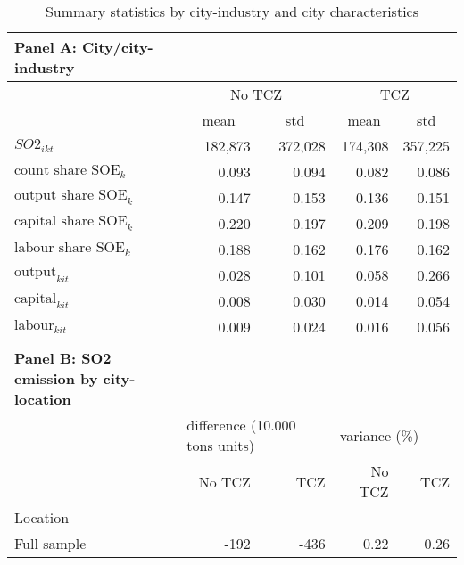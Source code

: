 \documentclass[12pt]{article}
\begin{document}
\begin{table}[!htbp] \centering
    \caption{ Summary statistics by city-industry and city characteristics}
      \begin{adjustbox}{width=\textwidth, totalheight=\baselineskip,keepaspectratio}
    \label{tab:table2}
    \begin{tabular}{lrrrr}
      \multicolumn{1}{l}{\textbf{\small Panel A: City/city-industry}} \\
      \toprule
      & \multicolumn{2}{c}{No TCZ} & \multicolumn{2}{c}{TCZ} \\
      & \multicolumn{1}{c}{mean} & \multicolumn{1}{c}{std} & \multicolumn{1}{c}{mean} & \multicolumn{1}{c}{std}\\
      \midrule
      $SO2_{ikt}$                  & 182,873 & 372,028 & 174,308 & 357,225 \\
      $\text{count share SOE}_k$   & 0.093  & 0.094  & 0.082  & 0.086  \\
      $\text{output share SOE}_k$  & 0.147  & 0.153  & 0.136  & 0.151  \\
      $\text{capital share SOE}_k$ & 0.220  & 0.197  & 0.209  & 0.198  \\
      $\text{labour share SOE}_k$  & 0.188  & 0.162  & 0.176  & 0.162  \\
      $\text{output}_{kit}$        & 0.028  & 0.101  & 0.058  & 0.266  \\
      $\text{capital}_{kit}$       & 0.008  & 0.030  & 0.014  & 0.054  \\
      $\text{labour}_{kit}$        & 0.009  & 0.024  & 0.016  & 0.056  \\
      \bottomrule
      \\ %
      \multicolumn{1}{l}{\textbf{\small Panel B: SO2 emission by city-location}} \\
      \toprule
      {} & \multicolumn{2}{l}{\footnotesize difference (10.000 tons units)} & \multicolumn{2}{l}{variance (\footnotesize \%)} \\
                  & No TCZ   & TCZ      & No TCZ & TCZ  \\
      Location    &          &          &        &      \\
      \midrule
      Full sample &    -192 & -436 &     0.22 & 0.26 \\

\end{tabular}
\end{adjustbox}
\end{table}
\end{document}
